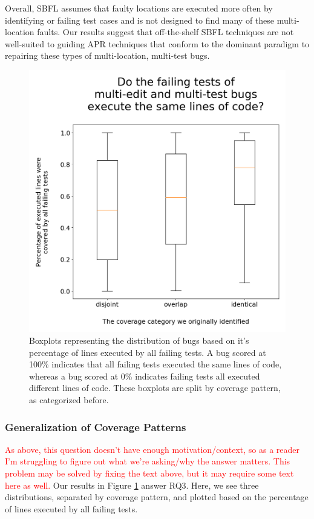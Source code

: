\documentclass[10pt, conference]{IEEEtran}
\newcommand\todo[1]{\textcolor{red}{#1}}
\begin{document}
Overall, SBFL assumes that faulty locations are executed more often by identifying 
or failing test cases and is not designed to find many of these multi-location
faults. Our results suggest that off-the-shelf SBFL techniques are not
well-suited to guiding APR techniques that conform to the dominant paradigm to repairing
these types of multi-location, multi-test bugs.

\begin{figure}
	\includegraphics[width=.9\linewidth,left]{img/coverage-buggy.png}
	\caption{Boxplots representing the distribution of bugs based on it's percentage of lines 
	executed 
	by all failing tests. A bug scored at 100\% indicates that all failing tests executed the same 
	lines of 
	code, whereas a bug scored at 0\% indicates failing tests all executed different lines of 
	code. 
	These boxplots are split by coverage pattern, as categorized before.}
	\label{fig:coverage-buggy}
\end{figure}

\subsubsection{Generalization of Coverage Patterns}
\todo{As above, this question doesn't have enough motivation/context, so as a
  reader I'm struggling to figure out what we're asking/why the answer matters.
  This problem may be solved by fixing the text above, but it may require some
  text here as well.}
Our results in Figure \ref{fig:coverage-buggy} answer RQ3. Here, we see three distributions, 
separated by coverage pattern, and plotted based on the percentage of lines executed by all 
failing tests. 
\end{document}
